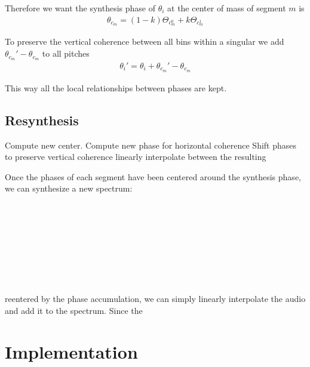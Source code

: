 \documentclass[12pt]{article}
\begin{document}
Therefore we want the synthesis phase of $\theta_i$ at the center of mass of segment $m$ is
\begin{align}
  \theta_{c_m} = (1-k)\Theta_{c_m^0} + k\Theta_{c_m^1}
\end{align}

To preserve the vertical coherence between all bins within a singular
we add $\theta_{c_m}' - \theta_{c_m}$ to all pitches
\begin{align}
  \theta_i' = \theta_i + \theta_{c_m}' - \theta_{c_m}
\end{align}

This way all the local relationships between phases are kept.

\subsection{Resynthesis}

Compute new center.
Compute new phase for horizontal coherence
Shift phases to preserve vertical coherence
linearly interpolate between the resulting

Once the phases of each segment have been centered around the synthesis phase,
we can synthesize a new spectrum:

\begin{algorithmic}
\\
\EndFor
\\
  \\
  \\
    \\
    \\
    \\
  \EndFor
\EndFor
\end{algorithmic}


reentered by the phase accumulation, 
we can simply linearly interpolate the audio and add it to the spectrum.
Since the 

\section{Implementation}
\end{document}
